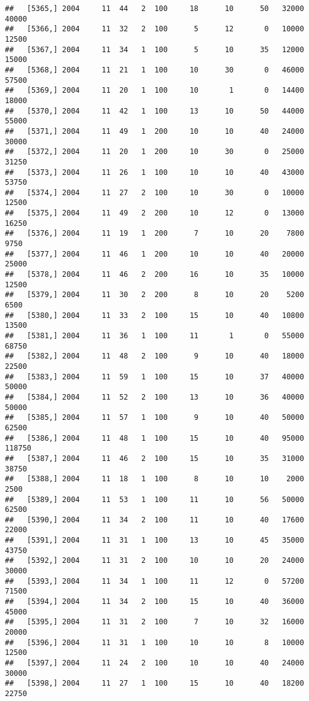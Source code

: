 \documentclass{article}\usepackage[]{graphicx}\usepackage[]{color}
\makeatletter
\newenvironment{kframe}{%
 \def\at@end@of@kframe{}%
 \ifinner\ifhmode%
  \def\at@end@of@kframe{\end{minipage}}%
  \begin{minipage}{\columnwidth}%
 \fi\fi%
 \def\FrameCommand##1{\hskip\@totalleftmargin \hskip-\fboxsep
 \colorbox{shadecolor}{##1}\hskip-\fboxsep
     \hskip-\linewidth \hskip-\@totalleftmargin \hskip\columnwidth}%
 \MakeFramed {\advance\hsize-\width
   \@totalleftmargin\z@ \linewidth\hsize
   \@setminipage}}%
 {\par\unskip\endMakeFramed%
 \at@end@of@kframe}
\newenvironment{knitrout}{}{} %
\makeatother
\begin{document}
\begin{knitrout}
\begin{kframe}
\begin{verbatim}
##   [5365,] 2004     11  44   2  100     18      10      50   32000   40000
##   [5366,] 2004     11  32   2  100      5      12       0   10000   12500
##   [5367,] 2004     11  34   1  100      5      10      35   12000   15000
##   [5368,] 2004     11  21   1  100     10      30       0   46000   57500
##   [5369,] 2004     11  20   1  100     10       1       0   14400   18000
##   [5370,] 2004     11  42   1  100     13      10      50   44000   55000
##   [5371,] 2004     11  49   1  200     10      10      40   24000   30000
##   [5372,] 2004     11  20   1  200     10      30       0   25000   31250
##   [5373,] 2004     11  26   1  100     10      10      40   43000   53750
##   [5374,] 2004     11  27   2  100     10      30       0   10000   12500
##   [5375,] 2004     11  49   2  200     10      12       0   13000   16250
##   [5376,] 2004     11  19   1  200      7      10      20    7800    9750
##   [5377,] 2004     11  46   1  200     10      10      40   20000   25000
##   [5378,] 2004     11  46   2  200     16      10      35   10000   12500
##   [5379,] 2004     11  30   2  200      8      10      20    5200    6500
##   [5380,] 2004     11  33   2  100     15      10      40   10800   13500
##   [5381,] 2004     11  36   1  100     11       1       0   55000   68750
##   [5382,] 2004     11  48   2  100      9      10      40   18000   22500
##   [5383,] 2004     11  59   1  100     15      10      37   40000   50000
##   [5384,] 2004     11  52   2  100     13      10      36   40000   50000
##   [5385,] 2004     11  57   1  100      9      10      40   50000   62500
##   [5386,] 2004     11  48   1  100     15      10      40   95000  118750
##   [5387,] 2004     11  46   2  100     15      10      35   31000   38750
##   [5388,] 2004     11  18   1  100      8      10      10    2000    2500
##   [5389,] 2004     11  53   1  100     11      10      56   50000   62500
##   [5390,] 2004     11  34   2  100     11      10      40   17600   22000
##   [5391,] 2004     11  31   1  100     13      10      45   35000   43750
##   [5392,] 2004     11  31   2  100     10      10      20   24000   30000
##   [5393,] 2004     11  34   1  100     11      12       0   57200   71500
##   [5394,] 2004     11  34   2  100     15      10      40   36000   45000
##   [5395,] 2004     11  31   2  100      7      10      32   16000   20000
##   [5396,] 2004     11  31   1  100     10      10       8   10000   12500
##   [5397,] 2004     11  24   2  100     10      10      40   24000   30000
##   [5398,] 2004     11  27   1  100     15      10      40   18200   22750

\end{verbatim}
\end{kframe}
\end{knitrout}
\end{document}
